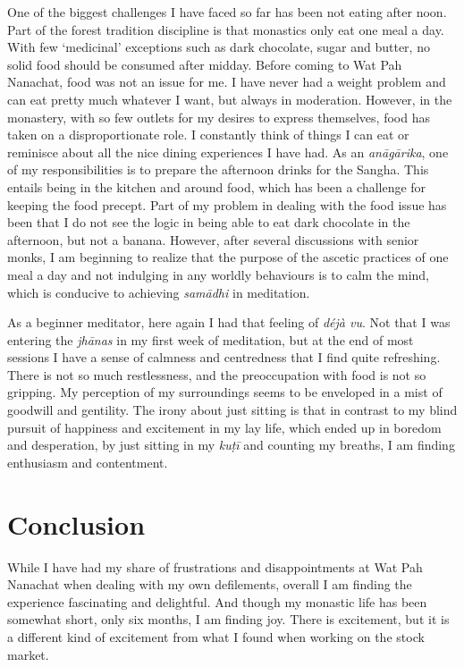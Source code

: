 One of the biggest challenges I have faced so far has been not eating
after noon. Part of the forest tradition discipline is that monastics
only eat one meal a day. With few `medicinal' exceptions such as dark
chocolate, sugar and butter, no solid food should be consumed after
midday. Before coming to Wat Pah Nanachat, food was not an issue for me. 
I have never had a weight problem and can eat pretty much whatever I
want, but always in moderation. However, in the monastery, with so few
outlets for my desires to express themselves, food has taken on a
disproportionate role. I constantly think of things I can eat or
reminisce about all the nice dining experiences I have had. As an
\emph{anāgārika}, one of my responsibilities is to prepare the afternoon
drinks for the Sangha. This entails being in the kitchen and around
food, which has been a challenge for keeping the food precept. Part of
my problem in dealing with the food issue has been that I do not see the
logic in being able to eat dark chocolate in the afternoon, but not a
banana. However, after several discussions with senior monks, I am
beginning to realize that the purpose of the ascetic practices of one
meal a day and not indulging in any worldly behaviours is to calm the
mind, which is conducive to achieving \emph{samādhi} in meditation. 

As a beginner meditator, here again I had that feeling of \emph{déjà
vu}. Not that I was entering the \emph{jhānas} in my first week of
meditation, but at the end of most sessions I have a sense of calmness
and centredness that I find quite refreshing. There is not so much
restlessness, and the preoccupation with food is not so gripping. My
perception of my surroundings seems to be enveloped in a mist of
goodwill and gentility. The irony about just sitting is that in contrast
to my blind pursuit of happiness and excitement in my lay life, which
ended up in boredom and desperation, by just sitting in my \emph{kuṭī}
and counting my breaths, I am finding enthusiasm and contentment. 

\section{Conclusion}

While I have had my share of frustrations and disappointments at Wat Pah
Nanachat when dealing with my own defilements, overall I am finding the
experience fascinating and delightful. And though my monastic life has
been somewhat short, only six months, I am finding joy. There is
excitement, but it is a different kind of excitement from what I found
when working on the stock market. 

